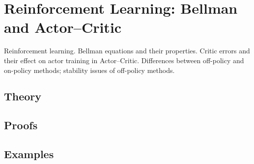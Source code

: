 
\section{Reinforcement Learning: Bellman and Actor–Critic}
\label{sec:2.5.10-reinforcement-learning}

\begin{ticket}
Reinforcement learning. Bellman equations and their properties. Critic errors and their effect on actor training in Actor–Critic. Differences between off-policy and on-policy methods; stability issues of off-policy methods.
\end{ticket}

\subsection*{Theory}

\subsection*{Proofs}

\subsection*{Examples}
